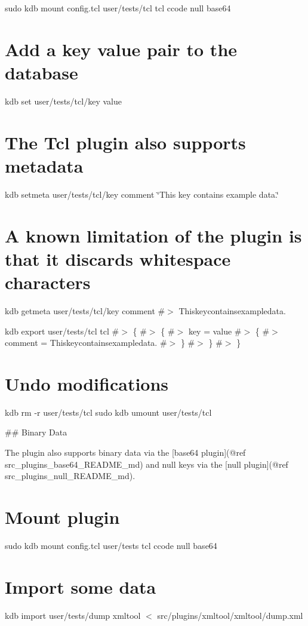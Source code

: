 sudo kdb mount config.\+tcl user/tests/tcl tcl ccode null base64

\section*{Add a key value pair to the database}

kdb set user/tests/tcl/key value \section*{The Tcl plugin also supports metadata}

kdb setmeta user/tests/tcl/key comment \char`\"{}\+This key contains example data.\char`\"{} \section*{A known limitation of the plugin is that it discards whitespace characters}

kdb getmeta user/tests/tcl/key comment \#$>$ Thiskeycontainsexampledata.

kdb export user/tests/tcl tcl \#$>$ \{ \#$>$ \{ \#$>$ key = value \#$>$ \{ \#$>$ comment = Thiskeycontainsexampledata. \#$>$ \} \#$>$ \} \#$>$ \}

\section*{Undo modifications}

kdb rm -\/r user/tests/tcl sudo kdb umount user/tests/tcl 
\begin{DoxyCode}
## Binary Data

The plugin also supports binary data via the [base64 plugin](@ref src\_plugins\_base64\_README\_md) and null
       keys via the [null plugin](@ref src\_plugins\_null\_README\_md).
\end{DoxyCode}
 \section*{Mount plugin}

sudo kdb mount config.\+tcl user/tests tcl ccode null base64

\section*{Import some data}

kdb import user/tests/dump xmltool $<$ src/plugins/xmltool/xmltool/dump.\+xml

